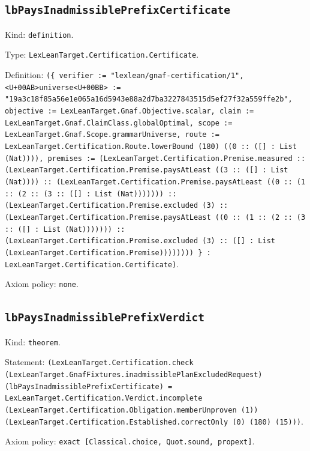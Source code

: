 \documentclass[11pt]{article}
\begin{document}
\subsection*{\texttt{lbPaysInadmissiblePrefixCertificate}}
\noindent Kind: \texttt{definition}.\par
\noindent Type: \texttt{LexLeanTarget.Certification.Certificate}.\par
\noindent Definition: \texttt{(\{ verifier := "lexlean/gnaf-certification/1", <U+00AB>universe<U+00BB> := "19a3c18f85a56e1e065a16d5943e88a2d7ba3227843515d5ef27f32a559ffe2b", objective := LexLeanTarget.Gnaf.Objective.scalar, claim := LexLeanTarget.Gnaf.ClaimClass.globalOptimal, scope := LexLeanTarget.Gnaf.Scope.grammarUniverse, route := LexLeanTarget.Certification.Route.lowerBound (180) ((0 :: ([] : List (Nat)))), premises := (LexLeanTarget.Certification.Premise.measured :: (LexLeanTarget.Certification.Premise.paysAtLeast ((3 :: ([] : List (Nat)))) :: (LexLeanTarget.Certification.Premise.paysAtLeast ((0 :: (1 :: (2 :: (3 :: ([] : List (Nat))))))) :: (LexLeanTarget.Certification.Premise.excluded (3) :: (LexLeanTarget.Certification.Premise.paysAtLeast ((0 :: (1 :: (2 :: (3 :: ([] : List (Nat))))))) :: (LexLeanTarget.Certification.Premise.excluded (3) :: ([] : List (LexLeanTarget.Certification.Premise)))))))) \} : LexLeanTarget.Certification.Certificate)}.\par
\noindent Axiom policy: \texttt{none}.\par
\subsection*{\texttt{lbPaysInadmissiblePrefixVerdict}}
\noindent Kind: \texttt{theorem}.\par
\noindent Statement: \texttt{(LexLeanTarget.Certification.check (LexLeanTarget.GnafFixtures.inadmissiblePlanExcludedRequest) (lbPaysInadmissiblePrefixCertificate) = LexLeanTarget.Certification.Verdict.incomplete (LexLeanTarget.Certification.Obligation.memberUnproven (1)) (LexLeanTarget.Certification.Established.correctOnly (0) (180) (15)))}.\par
\noindent Axiom policy: \texttt{exact [Classical.choice, Quot.sound, propext]}.\par
\end{document}
